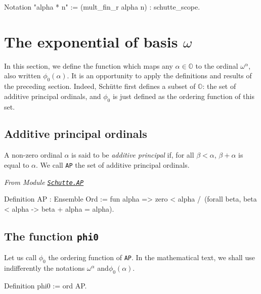 {\begin{Coqsrc}
Notation "alpha * n" := (mult_fin_r alpha n) : schutte_scope.
\end{Coqsrc}

\section{The exponential of basis \texorpdfstring{$\omega$}{omega}}

In this section, we define the function which maps any $\alpha\in\mathbb{O}$ to
the ordinal  $\omega^\alpha$, also written 
$\phi_0(\alpha)$. 
It is an opportunity to apply the definitions and results of the preceding section. 
Indeed,  Schütte first defines a subset of $\mathbb{O}$: the set of additive principal ordinals, and $\phi_0$  is just defined as the ordering function of this set.

\subsection{Additive principal ordinals}


\begin{definition}
A non-zero ordinal  $\alpha$ is said to be \emph{additive principal} if, for all  $\beta<\alpha$, $\beta+\alpha$ is equal to  $\alpha$.
We call \texttt{AP} the set of additive principal ordinals.

\end{definition}



\noindent\emph{From Module \href{../theories/html/hydras.Schutte.AP.html}%
{\texttt{Schutte.AP}}}

\begin{Coqsrc}
Definition AP : Ensemble Ord :=
  fun alpha => 
  zero < alpha /\
  (forall beta, beta < alpha ->  beta + alpha = alpha).
\end{Coqsrc}

\subsection{The function \texttt{phi0}}

Let us call  $\phi_0$ the ordering function of \texttt{AP}.
In the mathematical text, we shall use indifferently the notations  $\omega^\alpha$ and$\phi_0(\alpha)$. 

\begin{Coqsrc}
Definition phi0 := ord AP.


\end{Coqsrc}}
